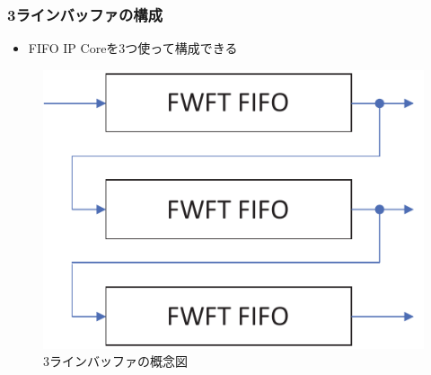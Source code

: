 ﻿\documentclass[dvipdfmx]{beamer}
\begin{document}
\begin{frame}
	\frametitle{3ラインバッファの構成}
	\begin{itemize}
		\item
			FIFO IP Coreを3つ使って構成できる
	\end{itemize}
	\begin{figure}[ht]
		\centering
		\includegraphics[width=0.4\linewidth]{../img/3lb_fifo.pdf}
		\caption{3ラインバッファの概念図}
		\label{img:3lb_fifo}
	\end{figure}
\end{frame}
\end{document}
